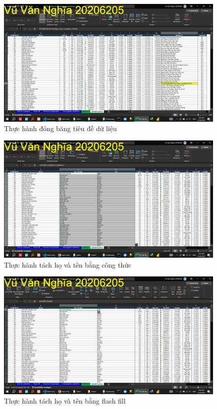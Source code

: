 \documentclass{article}
\begin{document}
\begin{figure}[H]
\centering
\includegraphics[scale = 0.15]{Video1/ThucHanh/2.png}
\caption{Thực hành đóng băng tiêu đề dữ liệu}
\end{figure}

\begin{figure}[H]
\centering
\includegraphics[scale = 0.15]{Video1/ThucHanh/3.png}
\caption{Thực hành tách họ và tên bằng công thức}
\end{figure}

\begin{figure}[H]
\centering
\includegraphics[scale = 0.15]{Video1/ThucHanh/4.png}
\caption{Thực hành tách họ và tên bằng flash fill}
\end{figure}
\end{document}
